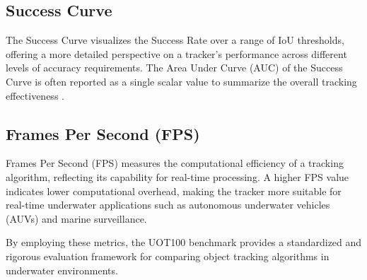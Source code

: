 \subsection{Success Curve}
The Success Curve visualizes the Success Rate over a range of IoU thresholds, offering a more detailed perspective on a tracker’s performance across different levels of accuracy requirements. The Area Under Curve (AUC) of the Success Curve is often reported as a single scalar value to summarize the overall tracking effectiveness \cite{wu2013online}.

\subsection{Frames Per Second (FPS)}
Frames Per Second (FPS) measures the computational efficiency of a tracking algorithm, reflecting its capability for real-time processing. A higher FPS value indicates lower computational overhead, making the tracker more suitable for real-time underwater applications such as autonomous underwater vehicles (AUVs) and marine surveillance.

By employing these metrics, the UOT100 benchmark provides a standardized and rigorous evaluation framework for comparing object tracking algorithms in underwater environments.

\endinput